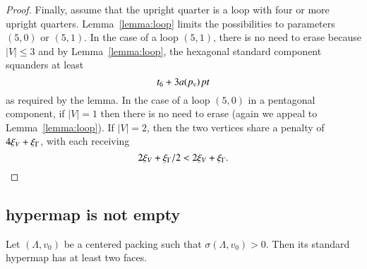 \begin{proof}
Finally, assume that the upright quarter is a loop with four or
more upright quarters.  Lemma~\ref{lemma:loop} limits the
possibilities to parameters $(5,0)$ or $(5,1)$.  In the case of a
loop $(5,1)$, there is no need to erase because $|V|\le3$ and by
Lemma~\ref{lemma:loop}, the hexagonal standard component squanders at
least
   $$t_6 + 3 a(p_v)\,\hbox{\it pt}$$
as required by the lemma.  In the case of a loop $(5,0)$ in a
pentagonal component, if $|V|=1$ then there is no need to erase
(again we appeal to Lemma~\ref{lemma:loop}).  If $|V| =2$, then
the two vertices share a penalty of $4\xi_V + \xi_\Gamma$, with each
receiving
   $$2\xi_V + \xi_\Gamma/2 < 2\xi_V +\xi_\Gamma.$$
\end{proof}












\subsection{hypermap is not empty}




\begin{lemma}\label{prop:nonempty} 
Let $(\Lambda,v_0)$ be a centered packing such that $\sigma(\Lambda,v_0)>0$.
Then its standard hypermap has at least two faces.
\end{lemma}

